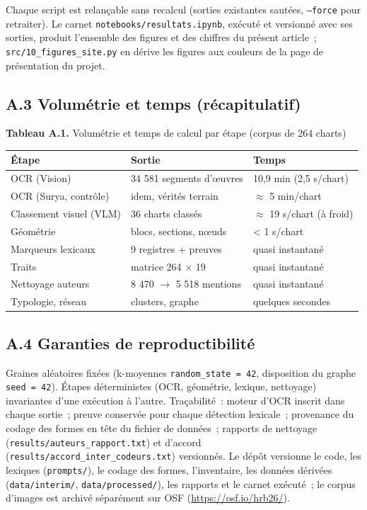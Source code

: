 \documentclass[11pt,a4paper]{article}
\begin{document}
Chaque script est relançable sans recalcul (sorties existantes sautées, \texttt{--force} pour retraiter). Le carnet \texttt{notebooks/resultats.ipynb}, exécuté et versionné avec ses sorties, produit l'ensemble des figures et des chiffres du présent article~; \texttt{src/10\_figures\_site.py} en dérive les figures aux couleurs de la page de présentation du projet.

\subsection*{A.3 Volumétrie et temps (récapitulatif)}

\noindent \textbf{Tableau A.1.} Volumétrie et temps de calcul par étape (corpus de 264 charts)\\[-0.2em]

\begin{center}\small
\begin{tabular}{lll}
\toprule
\textbf{Étape} & \textbf{Sortie} & \textbf{Temps} \\
\midrule
OCR (Vision) & 34 581 segments d'œuvres & 10,9 min (2,5 s/chart) \\
OCR (Surya, contrôle) & idem, vérités terrain & $\approx$ 5 min/chart \\
Classement visuel (VLM) & 36 charts classés & $\approx$ 19 s/chart (à froid) \\
Géométrie & blocs, sections, nœuds & < 1 s/chart \\
Marqueurs lexicaux & 9 registres + preuves & quasi instantané \\
Traits & matrice 264 $\times$ 19 & quasi instantané \\
Nettoyage auteurs & 8 470 $\rightarrow$ 5 518 mentions & quasi instantané \\
Typologie, réseau & clusters, graphe & quelques secondes \\
\bottomrule
\end{tabular}
\end{center}

\subsection*{A.4 Garanties de reproductibilité}

Graines aléatoires fixées (k-moyennes \texttt{random\_state = 42}, disposition du graphe \texttt{seed = 42}). Étapes déterministes (OCR, géométrie, lexique, nettoyage) invariantes d'une exécution à l'autre. Traçabilité~: moteur d'OCR inscrit dans chaque sortie~; preuve conservée pour chaque détection lexicale~; provenance du codage des formes en tête du fichier de données~; rapports de nettoyage (\texttt{results/auteurs\_rapport.txt}) et d'accord (\texttt{results/accord\_inter\_codeurs.txt}) versionnés. Le dépôt versionne le code, les lexiques (\texttt{prompts/}), le codage des formes, l'inventaire, les données dérivées (\texttt{data/interim/}, \texttt{data/processed/}), les rapports et le carnet exécuté~; le corpus d'images est archivé séparément sur OSF (\url{https://osf.io/hrb26/}).
\end{document}
